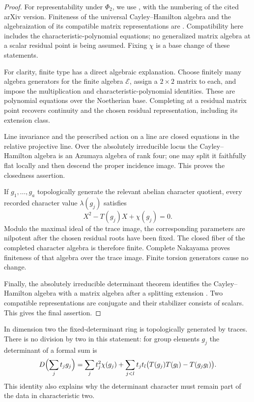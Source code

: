 \begin{proof}
For representability under $\Phi_2$, we use
\cite[Propositions~3.3 and~3.7, Remark~3.5]{Chenevier2014}, with the
numbering of the cited arXiv version.  Finiteness of the universal
Cayley--Hamilton algebra and the algebraization of its compatible
matrix representations are
\cite[Propositions~3.2 and~3.6, Theorems~3.7 and~3.8]{WangErickson2018}.
Compatibility here includes the characteristic-polynomial equations;
no generalized matrix algebra at a scalar residual point is being
assumed.  Fixing $\chi$ is a base change of these statements.

For clarity, finite type has a direct algebraic explanation.  Choose
finitely many algebra generators for the finite algebra $\mathscr E$, assign a
$2\times2$ matrix to each, and impose the multiplication and
characteristic-polynomial identities.  These are polynomial equations
over the Noetherian base.  Completing at a residual matrix point
recovers continuity and the chosen residual representation, including
its extension class.

Line invariance and the prescribed action on a line are closed
equations in the relative projective line.  Over the absolutely
irreducible locus the Cayley--Hamilton algebra is an Azumaya algebra of
rank four; one may split it faithfully flat locally and then descend
the proper incidence image.  This proves the closedness assertion.

If $g_1,\ldots,g_a$ topologically generate the relevant abelian
character quotient, every recorded character value $\lambda(g_j)$
satisfies
\[
 X^2-T(g_j)X+\chi(g_j)=0.
\]
Modulo the maximal ideal of the trace image, the corresponding
parameters are nilpotent after the chosen residual roots have been
fixed.  The closed fiber of the completed character algebra is
therefore finite.  Complete Nakayama proves finiteness of that algebra
over the trace image.  Finite torsion generators cause no change.

Finally, the absolutely irreducible determinant theorem identifies the
Cayley--Hamilton algebra with a matrix algebra after a splitting
extension \cite[Theorem~2.22 and Corollary~2.23]{Chenevier2014}.  Two compatible representations are conjugate and their
stabilizer consists of scalars.  This gives the final assertion.
\end{proof}

In dimension two the fixed-determinant ring is topologically generated
by traces.  There is no division by two in this statement: for group
elements $g_j$ the determinant of a formal sum is
\[
D\Bigl(\sum_j t_jg_j\Bigr)
=\sum_jt_j^2\chi(g_j)
 +\sum_{j<l}t_jt_l\bigl(T(g_j)T(g_l)-T(g_jg_l)\bigr).
\]
This identity also explains why the determinant character must remain
part of the data in characteristic two.

